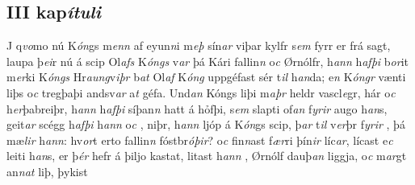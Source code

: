 \beginnumbering \pstart 
\vspace{5mm} \subsection*{III kap\textit{ítuli}} 
J   q\textit{vo}mo nú K\textit{ón}gs m\textit{enn} af eyun\textit{n}i m\textit{eþ} sín\textit{ar} viþar  kylfr s\textit{em} fyrr er frá sagt, laupa þ\textit{ei}r nú á scip Ol\textit{afs} K\textit{óngs} v\textit{ar} þá Kári fallin\textit{n} o\textit{c} Ørnólfr, h\textit{ann} h\textit{afþi} b\textit{or}it m\textit{er}ki   K\textit{óngs} Hr\textit{aung}v\textit{iþr} b\textit{at} Ol\textit{af} K\textit{óng}
  uppgéfast   
  sér t\textit{il} h\textit{an}da; e\textit{n} K\textit{óngr} vænti liþs o\textit{c} tregþaþi andsv\textit{ar} a\textit{t} géfa. 
 Und\textit{an} Kóngs liþi  m\textit{aþr} heldr vascl\textit{e}gr, 
 hár o\textit{c} h\textit{er}þabreiþr, h\textit{ann} h\textit{afþi} síþan\textit{n} hatt á hỏfþi, s\textit{em} slapti of\textit{an} f\textit{yrir} augo h\textit{an}s, 
 geit\textit{ar} scégg h\textit{afþi} h\textit{ann}  o\textit{c} , 
   niþr, h\textit{ann} ljóp  á K\textit{ón}gs scip,   þ\textit{ar} t\textit{il} 
   v\textit{er}þr f\textit{yrir} 
  , þá mæ\textit{lir} h\textit{ann}: hv\textit{or}t  erto fallin\textit{n}
fóstbr\textit{óþir}? o\textit{c} fin\textit{n}ast f\textit{ær}ri þín\textit{ir} líc\textit{ar},  
 lícast  
 e\textit{c} leiti h\textit{an}s, er þ\textit{ér} hefr á þiljo kastat, 
 litast h\textit{ann}    
 ,  
  Ørnólf dauþ\textit{an} liggja, 
 o\textit{c} m\textit{ar}gt an\textit{n}\textit{at} liþ, þykist 
